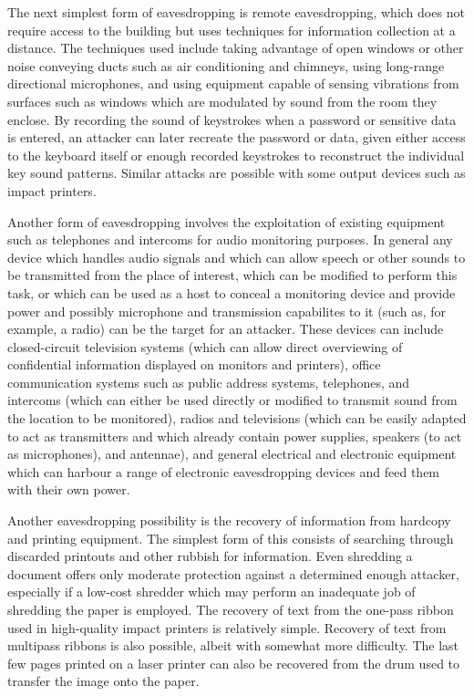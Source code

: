 The next simplest form of eavesdropping is remote eavesdropping, which does not
require access to the building but uses techniques for information collection
at a distance.  The techniques used include taking advantage of open windows or
other noise conveying ducts such as air conditioning and chimneys, using
long-range directional microphones, and using equipment capable of sensing
vibrations from surfaces such as windows which are modulated by sound from the
room they enclose.  By recording the sound of keystrokes when a password or
sensitive data is entered, an attacker can later recreate the password or data,
given either access to the keyboard itself or enough recorded keystrokes to
reconstruct the individual key sound patterns.  Similar attacks are possible
with some output devices such as impact printers.

Another form of eavesdropping involves the exploitation of existing equipment
such as telephones and intercoms for audio monitoring purposes.  In general any
device which handles audio signals and which can allow speech or other sounds
to be transmitted from the place of interest, which can be modified to perform
this task, or which can be used as a host to conceal a monitoring device and
provide power and possibly microphone and transmission capabilites to it (such
as, for example, a radio) can be the target for an attacker.  These devices can
include closed-circuit television systems (which can allow direct overviewing
of confidential information displayed on monitors and printers), office
communication systems such as public address systems, telephones, and intercoms
(which can either be used directly or modified to transmit sound from the
location to be monitored), radios and televisions (which can be easily adapted
to act as transmitters and which already contain power supplies, speakers (to
act as microphones), and antennae), and general electrical and electronic
equipment which can harbour a range of electronic eavesdropping devices and
feed them with their own power.

Another eavesdropping possibility is the recovery of information from hardcopy
and printing equipment.  The simplest form of this consists of searching
through discarded printouts and other rubbish for information.  Even shredding
a document offers only moderate protection against a determined enough
attacker, especially if a low-cost shredder which may perform an inadequate job
of shredding the paper is employed.  The recovery of text from the one-pass 
ribbon used in high-quality impact printers is relatively simple.  Recovery of 
text from multipass ribbons is also possible, albeit with somewhat more 
difficulty.  The last few pages printed on a laser printer can also be
recovered from the drum used to transfer the image onto the paper.

